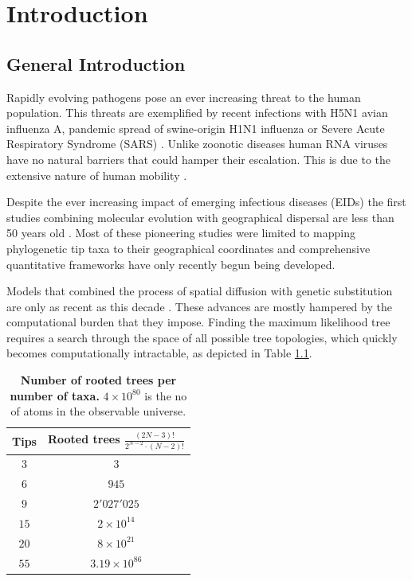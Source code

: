 \documentclass[12pt,twoside]{mitthesis}
\theoremstyle{plain}
\theoremstyle{definition}
\theoremstyle{remark}
\providecommand{\tabularnewline}{\\}
\begin{document}
\chapter{Introduction}

\section{General Introduction}

Rapidly evolving pathogens pose an ever increasing threat to the human population.
This threats are exemplified by recent infections with H5N1 avian influenza A, pandemic spread of swine-origin H1N1 influenza \citep{Rambaut2008} or Severe Acute Respiratory Syndrome (SARS) \citep{Ksiazek2003}.
Unlike zoonotic diseases human RNA viruses have no natural barriers that could hamper their escalation.
This is due to the extensive nature of human mobility \citep{Brockmann2006}.

Despite the ever increasing impact of emerging infectious diseases (EIDs) the first studies combining molecular evolution with geographical dispersal are less than 50 years old \citep{Henning1966}. 
Most of these pioneering studies were limited to mapping phylogenetic tip taxa to their geographical coordinates \citep{Kidd2006} and comprehensive quantitative frameworks have only recently begun being developed.

Models that combined the process of spatial diffusion with genetic substitution are only as recent as this decade \citep{Lemey2009,Lemey2010}.
These advances are mostly hampered by the computational burden that they impose.
Finding the maximum likelihood tree requires a search through the space of all possible tree topologies, which quickly becomes computationally intractable, as depicted in Table \ref{tab:maxLikeBurden}.

\begin{table}
\caption{{\bf{Number of rooted trees per number of taxa.}} $4 \times 10^{80} $ is the no of atoms in the observable universe.}
\begin{centering}
\begin{tabular}{cc}
\hline 
Tips & Rooted trees $\frac{(2N-3)!}{2^{N-2}\cdot(N-2)!}$ \tabularnewline
\hline 
\rowcolor{gray1}
$3$ & $3$\tabularnewline
$6$ & $945$\tabularnewline
\rowcolor{gray1}
$9$ & $2'027'025$\tabularnewline
$15$ & $2\times10^{14}$\tabularnewline
\rowcolor{gray1}
$20$ & $8\times10^{21}$\tabularnewline
$55$ & $3.19\times10^{86}$\tabularnewline
\end{tabular}
\par\end{centering}
\label{tab:maxLikeBurden}
\end{table}
\end{document}
